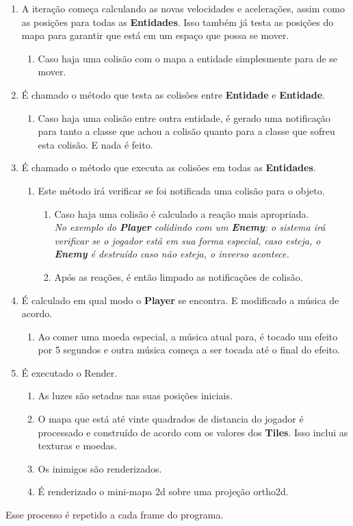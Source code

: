 \begin{enumerate}
	\item A iteração começa calculando as novas velocidades e acelerações, assim como as posições para todas as \textbf{Entidades}. Isso também já testa as posições do mapa para garantir que está em um espaço que possa se mover.
	\begin{enumerate}
		\item Caso haja uma colisão com o mapa a entidade simplesmente para de se mover.
	\end{enumerate}
%	
	\item É chamado o método que testa as colisões entre \textbf{Entidade} e \textbf{Entidade}.
	\begin{enumerate}
		\item Caso haja uma colisão entre outra entidade, é gerado uma notificação para tanto a classe que achou a colisão quanto para a classe que sofreu esta colisão. E nada é feito.
	\end{enumerate}
%
	\item É chamado o método que executa as colisões em todas as \textbf{Entidades}.
	\begin{enumerate}
		\item Este método irá verificar se foi notificada uma colisão para o objeto.
		\begin{enumerate}
			\item Caso haja uma colisão é calculado a reação mais apropriada. \\\textit{No exemplo do \textbf{Player} colidindo com um \textbf{Enemy}: o sistema irá verificar se o jogador está em sua forma especial, caso esteja, o \textbf{Enemy} é destruído caso não esteja, o inverso acontece.}
			\item Após as reações, é então limpado as notificações de colisão.
		\end{enumerate}
	\end{enumerate}
%
	\item É calculado em qual modo o \textbf{Player} se encontra. E modificado a música de acordo.
	\begin{enumerate}
		\item Ao comer uma moeda especial, a música atual para, é tocado um efeito por 5 segundos e outra música começa a ser tocada até o final do efeito.
	\end{enumerate}
%
	\item É executado o Render.
	\begin{enumerate}
		\item As luzes são setadas nas suas posições iniciais.
		\item O mapa que está até vinte quadrados de distancia do jogador é processado e construído de acordo com os valores dos \textbf{Tiles}. Isso inclui as texturas e moedas.
		\item Os inimigos são renderizados.
		\item É renderizado o mini-mapa 2d sobre uma projeção ortho2d.
	\end{enumerate}
\end{enumerate}

Esse processo é repetido a cada frame do programa.
